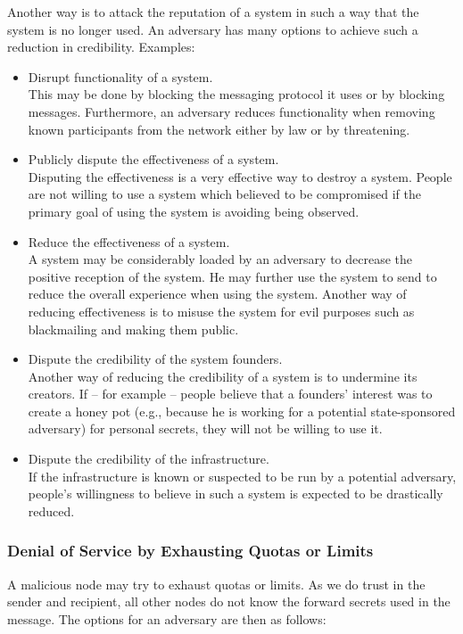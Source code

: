 Another way is to attack the reputation of a system in such a way that the system is no longer used. An adversary has many options to achieve such a reduction in credibility. Examples:
\begin{itemize}
	\item Disrupt functionality of a system.\\ 
	This may be done by blocking the messaging protocol it uses or by blocking messages. Furthermore, an adversary reduces functionality when removing known participants from the network either by law or by threatening.
	\item Publicly dispute the effectiveness of a system.\\
	Disputing the effectiveness is a very effective way to destroy a system. People are not willing to use a system which believed to be compromised if the primary goal of using the system is avoiding being observed.
	\item Reduce the effectiveness of a system.\\
	A system may be considerably loaded by an adversary to decrease the positive reception of the system. He may further use the system to send  to reduce the overall experience when using the system. Another way of reducing effectiveness is to misuse the system for evil purposes such as blackmailing and making them public.
	\item Dispute the credibility of the system founders.\\
	Another way of reducing the credibility of a system is to undermine its creators. If -- for example -- people believe that a founders' interest was to create a honey pot (e.g., because he is working for a potential state-sponsored adversary) for personal secrets, they will not be willing to use it.
	\item Dispute the credibility of the infrastructure.\\
	If the infrastructure is known or suspected to be run by a potential adversary, people's willingness to believe in such a system is expected to be drastically reduced.
\end{itemize}

\subsubsection{Denial of Service by Exhausting Quotas or Limits}
A malicious node may try to exhaust quotas or limits. As we do trust in the sender and recipient, all other nodes do not know the forward secrets used in the message. The options for an adversary are then as follows:

